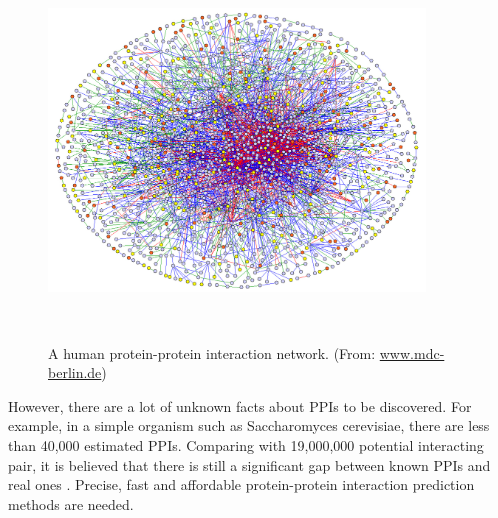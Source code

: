 \begin{figure}[h!]
\begin{center}
\includegraphics[height = 10cm, width = 10cm]{img/pro_inter_net.jpg}
\caption{A human protein-protein interaction network. (From: \href{https://www.mdc-berlin.de/}{www.mdc-berlin.de})  \label{fig:ppi_net}}
\end{center}
\end{figure}

However, there are a lot of unknown facts about PPIs to be discovered. For example, in a simple organism such as Saccharomyces cerevisiae, there are less than 40,000 estimated PPIs. Comparing with 19,000,000 potential interacting pair, it is believed that there is still a significant gap between known PPIs and real ones \cite{jessulat2011recent, sprinzak2003reliable}. Precise, fast and affordable protein-protein interaction prediction methods are needed.

